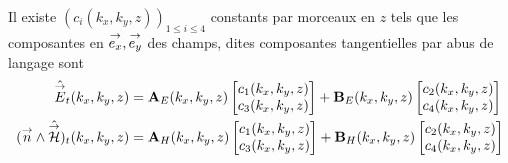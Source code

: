        \begin{prop}
            Il existe \((c_i(k_x,k_y,z))_{1\le i \le4}\) constants par morceaux en \(z\) tels que les composantes en \({\overset{\rightarrow}{e_x}},{\overset{\rightarrow}{e_y}}\) des champs, dites composantes tangentielles par abus de langage sont
            \begin{align*}
                \hat{{\overset{\rightarrow}{E}}}_t(k_x,k_y,z) &= \mathbf{A}_E(k_x,k_y,z) \begin{bmatrix}c_1(k_x,k_y,z) \\ c_3(k_x,k_y,z)\end{bmatrix} + \mathbf{B}_E(k_x,k_y,z) \begin{bmatrix}c_2(k_x,k_y,z) \\ c_4(k_x,k_y,z)\end{bmatrix}
                \\
                ({\overset{\rightarrow}{n}} \wedge \hat{{\overset{\rightarrow}{\mathcal{H}}}})_t(k_x,k_y,z) &= \mathbf{A}_H(k_x,k_y,z) \begin{bmatrix}c_1(k_x,k_y,z) \\ c_3(k_x,k_y,z)\end{bmatrix} + \mathbf{B}_H(k_x,k_y,z) \begin{bmatrix}c_2(k_x,k_y,z) \\ c_4(k_x,k_y,z)\end{bmatrix}
            \end{align*}
        \end{prop}

